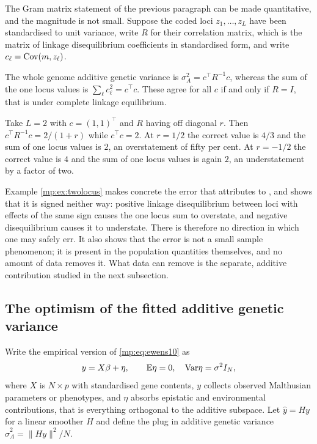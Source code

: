 \label{mp:sec:twolocus}

The Gram matrix statement of the previous paragraph can be made quantitative, and the magnitude is not small. Suppose the coded loci
$z_1,\dots,z_L$ have been standardised to unit variance, write $R$ for their correlation
matrix, which is the matrix of linkage disequilibrium coefficients in standardised form, and
write $c_\ell=\mathrm{Cov}(m,z_\ell)$.

\begin{proposition}
\label{mp:prop:gram}
The whole genome additive genetic variance is $\sigma_A^2=c^\top R^{-1}c$, whereas the sum
of the one locus values is $\sum_\ell c_\ell^2=c^\top c$. These agree for all $c$ if and only
if $R=I$, that is under complete linkage equilibrium.
\end{proposition}

\begin{example}
\label{mp:ex:twolocus}
Take $L=2$ with $c=(1,1)^\top$ and $R$ having off diagonal $r$. Then
$c^\top R^{-1}c = 2/(1+r)$ while $c^\top c = 2$. At $r=1/2$ the correct value is $4/3$ and
the sum of one locus values is $2$, an overstatement of fifty per cent. At $r=-1/2$ the
correct value is $4$ and the sum of one locus values is again $2$, an understatement by a
factor of two.
\end{example}

Example \ref{mp:ex:twolocus} makes concrete the error that \citet{mp:ewens2024} attributes to \citet{mp:fisher1930}, and shows that it is signed neither way: positive linkage disequilibrium between loci
with effects of the same sign causes the one locus sum to overstate, and negative
disequilibrium causes it to understate. There is therefore no direction in which one may
safely err. It also shows that the error is not a small sample phenomenon; it is present in
the population quantities themselves, and no amount of data removes it. What data can remove
is the separate, additive contribution studied in the next subsection.

\subsection{The optimism of the fitted additive genetic variance}

Write the empirical version of \eqref{mp:eq:ewens10} as
\begin{equation}
y = X\beta + \eta, \qquad \mathbb{E}\eta = 0,\quad \mathrm{Var}\eta=\sigma^2 I_N ,
\label{mp:eq:reg}
\end{equation}
where $X$ is $N\times p$ with standardised gene contents, $y$ collects observed Malthusian
parameters or phenotypes, and $\eta$ absorbs epistatic and environmental contributions, that
is everything orthogonal to the additive subspace. Let $\hat y=Hy$ for a linear smoother $H$
and define the plug in additive genetic variance $\hat\sigma_A^2=\|Hy\|^2/N$.

